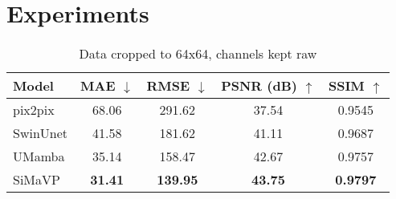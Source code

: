 \chapter{Experiments}

\begin{table}[]
\centering
\caption{Data cropped to 64x64, channels kept raw}
\label{tab:experiment_results}
\begin{tabular}{lcccc}
\hline
\textbf{Model} & \textbf{MAE} $\downarrow$ & \textbf{RMSE} $\downarrow$ & \textbf{PSNR (dB)} $\uparrow$ & \textbf{SSIM} $\uparrow$ \\
\hline
pix2pix  & 68.06 & 291.62 & 37.54 & 0.9545 \\
SwinUnet & 41.58 & 181.62 & 41.11 & 0.9687 \\
UMamba   & 35.14 & 158.47 & 42.67 & 0.9757 \\
SiMaVP   & \textbf{31.41} & \textbf{139.95} & \textbf{43.75} & \textbf{0.9797} \\
\hline
\end{tabular}
\end{table}

